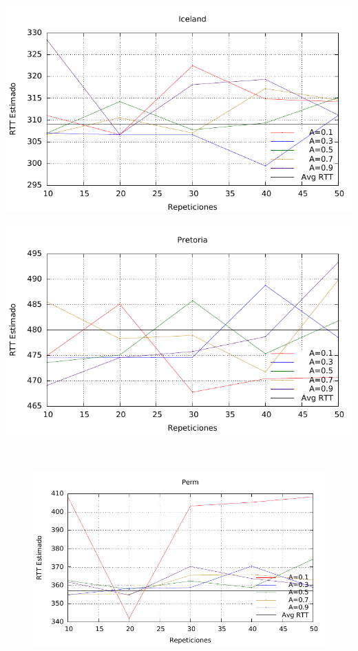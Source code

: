 \begin{minipage}{0.48\textwidth}
    \includegraphics[scale=0.62]{imgs/thoughput/hi_rtt.pdf}
\end{minipage}
\begin{minipage}{0.48\textwidth}
    \includegraphics[scale=0.62]{imgs/thoughput/pretoria_rtt.pdf}
\end{minipage}

~

\begin{figure}[htp]
 \centering
 \includegraphics[scale=0.80]{imgs/thoughput/psu_rtt.pdf}
\end{figure}

